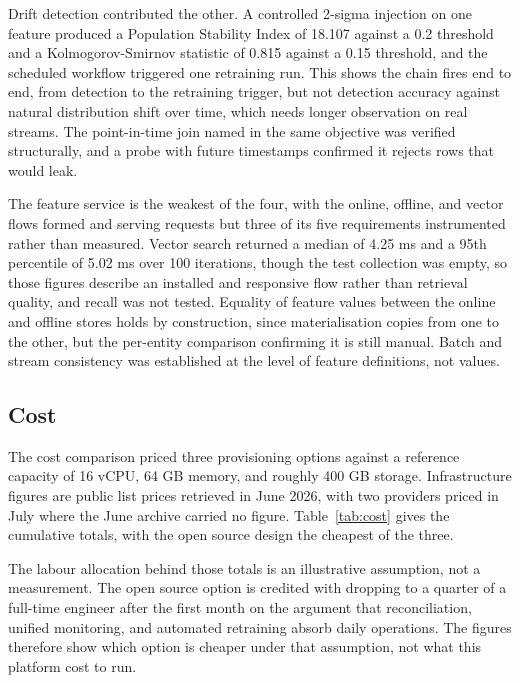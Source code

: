 Drift detection contributed the other. A controlled 2-sigma injection on one feature produced a Population Stability Index of 18.107 against a 0.2 threshold and a Kolmogorov-Smirnov statistic of 0.815 against a 0.15 threshold, and the scheduled workflow triggered one retraining run. This shows the chain fires end to end, from detection to the retraining trigger, but not detection accuracy against natural distribution shift over time, which needs longer observation on real streams. The point-in-time join named in the same objective was verified structurally, and a probe with future timestamps confirmed it rejects rows that would leak.

The feature service is the weakest of the four, with the online, offline, and vector flows formed and serving requests but three of its five requirements instrumented rather than measured. Vector search returned a median of 4.25 ms and a 95th percentile of 5.02 ms over 100 iterations, though the test collection was empty, so those figures describe an installed and responsive flow rather than retrieval quality, and recall was not tested. Equality of feature values between the online and offline stores holds by construction, since materialisation copies from one to the other, but the per-entity comparison confirming it is still manual. Batch and stream consistency was established at the level of feature definitions, not values.

\subsection{Cost}
\label{subsec:cost}



The cost comparison priced three provisioning options against a reference capacity of 16 vCPU, 64 GB memory, and roughly 400 GB storage. Infrastructure figures are public list prices retrieved in June 2026, with two providers priced in July where the June archive carried no figure. Table~\ref{tab:cost} gives the cumulative totals, with the open source design the cheapest of the three.

The labour allocation behind those totals is an illustrative assumption, not a measurement. The open source option is credited with dropping to a quarter of a full-time engineer after the first month on the argument that reconciliation, unified monitoring, and automated retraining absorb daily operations. The figures therefore show which option is cheaper under that assumption, not what this platform cost to run.

